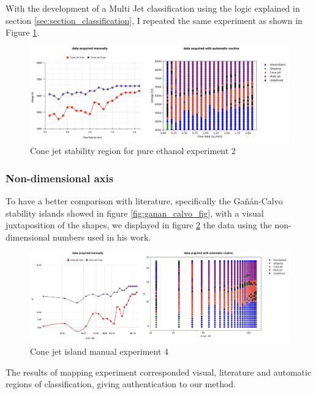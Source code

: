     With the development of a Multi Jet classification using the logic explained in section \ref{sec:section_classification}, I repeated the same experiment as shown in Figure \ref{fig:stability_6}.


        \begin{figure}[H]
            \center
            \includegraphics[width=18cm]{Figuras/april/map_third.png}
            \caption{Cone jet stability region for pure ethanol experiment 2}
            \label{fig:stability_6}
        \end{figure}


    \subsubsection{Non-dimensional axis}

    To have a better comparison with literature, specifically the Gañán-Calvo\cite{gananCalvo} stability islands showed in figure \ref{fig:ganan_calvo_fig}, with a visual juxtaposition of the shapes, we displayed in figure \ref{fig:stability_8} the data using the non-dimensional numbers used in his work\cite{gananCalvo}.

        \begin{figure}[H]
            \center
            \includegraphics[width=18cm]{Figuras/april/manual_au_1.png}
            \caption{Cone jet island manual experiment 4}
            \label{fig:stability_8}
        \end{figure}

    The results of mapping experiment corresponded visual, literature and automatic regions of classification, giving authentication to our method.


